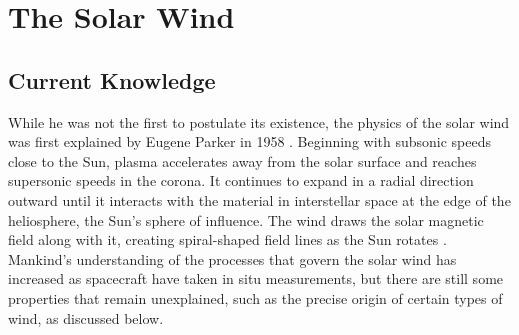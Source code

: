 \section{The Solar Wind}
\label{Solar Wind}

\subsection{Current Knowledge}
\label{SW Current Knowledge}
While he was not the first to postulate its existence, the physics of the solar wind was first explained by Eugene Parker in 1958 \citep{parker58}. Beginning with subsonic speeds close to the Sun, plasma accelerates away from the solar surface and reaches supersonic speeds in the corona. It continues to expand in a radial direction outward until it interacts with the material in interstellar space at the edge of the heliosphere, the Sun's sphere of influence. The wind draws the solar magnetic field along with it, creating spiral-shaped field lines as the Sun rotates \citep{parker59}. Mankind's understanding of the processes that govern the solar wind has increased as spacecraft have taken in situ measurements, but there are still some properties that remain unexplained, such as the precise origin of certain types of wind, as discussed below.

